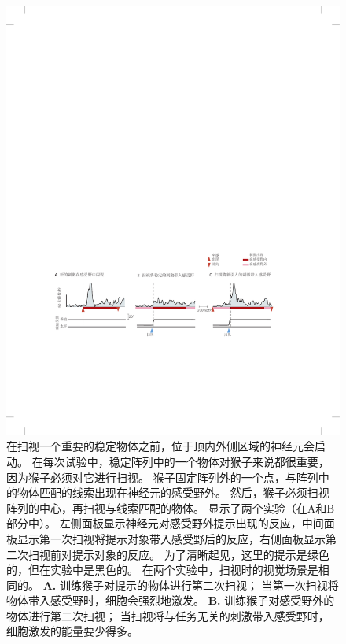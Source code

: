 \begin{figure}[htbp]
	\centering
	\includegraphics[width=1.0\linewidth]{chap25/fig_25_11}
	\caption{在扫视一个重要的稳定物体之前，位于顶内外侧区域的神经元会启动。
		在每次试验中，稳定阵列中的一个物体对猴子来说都很重要，因为猴子必须对它进行扫视。
		猴子固定阵列外的一个点，与阵列中的物体匹配的线索出现在神经元的感受野外。
		然后，猴子必须扫视阵列的中心，再扫视与线索匹配的物体。
		显示了两个实验（在A和B部分中）。
		左侧面板显示神经元对感受野外提示出现的反应，中间面板显示第一次扫视将提示对象带入感受野后的反应，右侧面板显示第二次扫视前对提示对象的反应。
		为了清晰起见，这里的提示是绿色的，但在实验中是黑色的。
		在两个实验中，扫视时的视觉场景是相同的。
		\textbf{A.} 训练猴子对提示的物体进行第二次扫视；
		当第一次扫视将物体带入感受野时，细胞会强烈地激发。
		\textbf{B.} 训练猴子对感受野外的物体进行第二次扫视；
		当扫视将与任务无关的刺激带入感受野时，细胞激发的能量要少得多。}
	\label{fig:25_12}
\end{figure}



